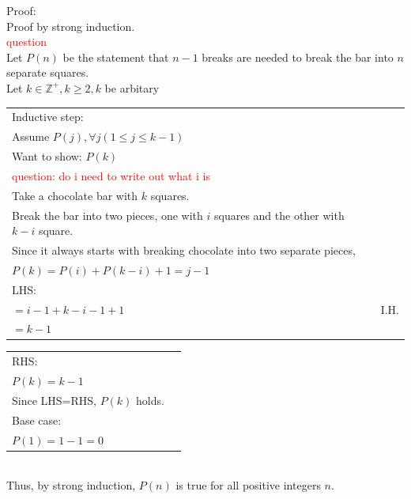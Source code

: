 \documentclass[12pt]{exam}
\begin{document}
\begin{solution}
	Proof: \\
	Proof by strong induction. \\
	\textcolor {red}{question} \\
	Let $P(n)$ be the statement that $n-1$ breaks are needed to break the bar into $n$ separate squares. \\
	Let $k\in \mathbb{Z}^+, k\ge 2, k$ be arbitary \\
	\begin{tabular}{ll}
		Inductive step:                                                                      \\
		Assume $P(j), \forall j(1\le j\le k-1)$                                              \\
		Want to show: $P(k)$                                                                 \\
		\textcolor {red}{question: do i need to write out what i is}                         \\
		Take a chocolate bar with $k$ squares.                                               \\
		Break the bar into two pieces, one with $i$ squares and the other with $k-i$ square. \\

		Since it always starts with breaking chocolate into two separate pieces,             \\
		$P(k)=P(i)+P(k-i)+1=j-1$                                                             \\
		LHS:                                                                                 \\
		$=i-1+k-i-1+1$ & I.H.                                                                \\
		$=k-1$                                                                               \\
	\end{tabular}
	\begin{tabular}{ll}
		RHS:                         \\
		$P(k)=k-1$                   \\
		Since LHS=RHS, $P(k)$ holds. \\
		Base case:                   \\
		$P(1)=1-1=0$                 \\
	\end{tabular}
	\\	Thus, by strong induction, $P(n)$ is true for all positive integers $n$.

\end{solution}
\end{document}
